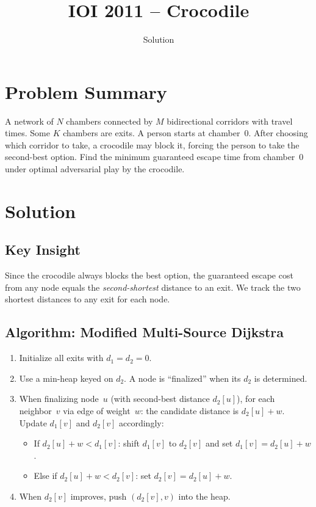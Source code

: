 \documentclass[11pt,a4paper]{article}
\title{IOI 2011 -- Crocodile}
\author{Solution}
\date{}
\begin{document}
\maketitle

\section{Problem Summary}
A network of $N$ chambers connected by $M$ bidirectional corridors with travel times. Some $K$ chambers are exits. A person starts at chamber~$0$. After choosing which corridor to take, a crocodile may block it, forcing the person to take the second-best option. Find the minimum guaranteed escape time from chamber~$0$ under optimal adversarial play by the crocodile.

\section{Solution}

\subsection{Key Insight}
Since the crocodile always blocks the best option, the guaranteed escape cost from any node equals the \emph{second-shortest} distance to an exit. We track the two shortest distances to any exit for each node.

\subsection{Algorithm: Modified Multi-Source Dijkstra}
\begin{enumerate}
    \item Initialize all exits with $d_1 = d_2 = 0$.
    \item Use a min-heap keyed on $d_2$. A node is ``finalized'' when its $d_2$ is determined.
    \item When finalizing node~$u$ (with second-best distance $d_2[u]$), for each neighbor~$v$ via edge of weight~$w$: the candidate distance is $d_2[u] + w$. Update $d_1[v]$ and $d_2[v]$ accordingly:
    \begin{itemize}
        \item If $d_2[u] + w < d_1[v]$: shift $d_1[v]$ to $d_2[v]$ and set $d_1[v] = d_2[u] + w$.
        \item Else if $d_2[u] + w < d_2[v]$: set $d_2[v] = d_2[u] + w$.
    \end{itemize}
    \item When $d_2[v]$ improves, push $(d_2[v], v)$ into the heap.
\end{enumerate}
\end{document}
